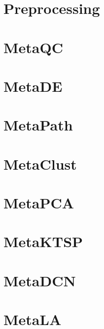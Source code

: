 \documentclass{article}
\begin{document}
\section{Preprocessing}

\section{MetaQC}

\section{MetaDE}

\section{MetaPath}

\section{MetaClust}

\section{MetaPCA}

\section{MetaKTSP}

\section{MetaDCN}

\section{MetaLA}



 
\end{document}
